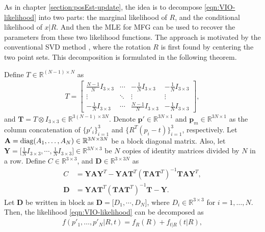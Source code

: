 As in chapter \ref{section:posEst-update}, the idea is to decompose \eqref{eqn:VIO-likelihood} into two parts: the marginal likelihood of $R$, and the conditional likelihood of $x|R$.
And then the MLE for MFG can be used to recover the parameters from these two likelihood functions.
The approach is motivated by the conventional SVD method \cite{arun1987least,besl1992method}, where the rotation $R$ is first found by centering the two point sets.
This decomposition is formulated in the following theorem.

\begin{theorem} \label{thm:VIO-factor}
	Define $T\in\mathbb{R}^{(N-1)\times N}$ as
	\begin{align}
		T = \begin{bmatrix} 
			\frac{N-1}{N} I_{3\times 3} & \cdots & -\frac{1}{N} I_{3\times 3} & -\frac{1}{N} I_{3\times 3}
			\\ \vdots & \ddots & \vdots & \vdots
			\\ -\frac{1}{N} I_{3\times 3} & \cdots & \frac{N-1}{N} I_{3\times 3} & -\frac{1}{N} I_{3\times 3} 
		\end{bmatrix},
	\end{align}
	and $\mathbf{T} = T\otimes I_{3\times 3} \in \mathbb{R}^{3(N-1)\times 3N}$.
	Denote $\bm{p}'\in\mathbb{R}^{3N\times 1}$ and $\bm{p}_m\in\mathbb{R}^{3N\times 1}$ as the column concatenation of $\{p'_i\}_{i=1}^3$ and $\{R^T(p_i-t)\}_{i=1}^3$, respectively.
	Let $\mathbf{A} = \mathrm{diag}(A_1,\ldots,A_N) \in \mathbb{R}^{3N\times 3N}$ be a block diagonal matrix.
	Also, let $\mathbf{Y} = \Big[ \tfrac{1}{N}I_{3\times 3}, \cdots, \tfrac{1}{N}I_{3\times 3} \Big] \in \mathbb{R}^{3N\times 3}$ be $N$ copies of identity matrices divided by $N$ in a row.
	Define $C\in\mathbb{R}^{3\times 3}$, and $\mathbf{D}\in\mathbb{R}^{3\times 3N}$ as
	\begin{align}
		C &= \mathbf{Y}\mathbf{A}\mathbf{Y}^T - \mathbf{Y}\mathbf{A}\mathbf{T}^T (\mathbf{T}\mathbf{A}\mathbf{T}^T)^{-1} \mathbf{T}\mathbf{A}\mathbf{Y}^T, \label{eqn:VIO-likelihood-C} \\
		\mathbf{D} &= \mathbf{Y}\mathbf{A}\mathbf{T}^T (\mathbf{T}\mathbf{A}\mathbf{T}^T)^{-1} \mathbf{T} - \mathbf{Y}. \label{eqn:VIO-likelihood-D}
	\end{align}
	Let $\mathbf{D}$ be written in block as $\mathbf{D} = \big[D_1, \cdots, D_N\big]$, where $D_i\in\mathbb{R}^{3\times 3}$ for $i=1,\ldots,N$.
	Then, the likelihood \eqref{eqn:VIO-likelihood} can be decomposed as
	\begin{align}
		f(p'_1,\ldots,p'_N | R,t) = f_R(R) + f_{t|R}(t|R),

\end{align}
\end{theorem}
